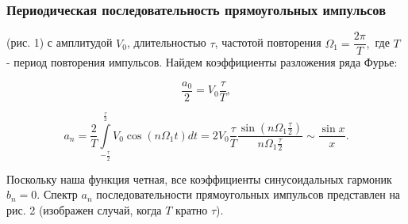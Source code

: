 \documentclass[a4paper, 12pt]{article}
\begin{document}
            \subsubsection{Периодическая последовательность прямоугольных импульсов}

                (рис. 1) с амплитудой $V_{0}$, длительностью $\tau$, частотой повторения $\Omega_{1}=\dfrac{2\pi}{T},$ где $T$ - период повторения импульсов. Найдем коэффициенты разложения ряда Фурье:

                $$\dfrac{a_{0}}{2}=V_{0}\dfrac{\tau}{T},$$

                \begin{equation}
                    a_{n}=\dfrac{2}{T}\int\limits_{-\frac{\tau}{2}}^{\frac{\tau}{2}}V_{0}\cos(n \Omega_{1} t)dt=2V_{0}\dfrac{\tau}{T}\dfrac{\sin(n \Omega_{1} \frac{\tau}{2})}{n\Omega_{1}\frac{\tau}{2}} \sim \dfrac{\sin x}{x}.
                    \label{eq4}
                \end{equation}

                Поскольку наша функция четная, все коэффициенты синусоидальных гармоник $b_{n}=0$. Спектр $a_{n}$ последовательности прямоугольных импульсов представлен на рис. 2 (изображен случай, когда $T$ кратно $\tau$).
\end{document}

